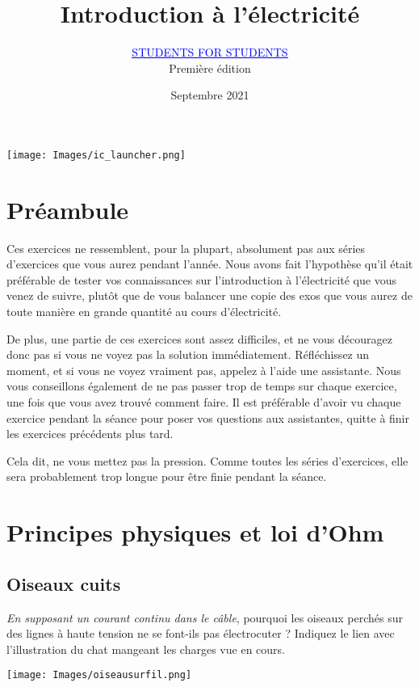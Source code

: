 \documentclass{article}
\title{Introduction à l'électricité}
\author{\href{https://s4s.fun}{\textcolor{blue}{\underline{STUDENTS FOR STUDENTS}}}\\Première édition}
\date{Septembre 2021}
\newcommand{\inc}{\fontfamily{cmr}\selectfont\textperiodcentered}
\begin{document}
\maketitle

\begin{center}
   \texttt{[image: Images/ic\_launcher.png]} 
\end{center}
\vfill
\tableofcontents
\vfill
\newpage

\setlength{\parskip}{1ex}

\section*{Préambule}

Ces exercices ne ressemblent, pour la plupart, absolument pas aux séries d'exercices que vous aurez pendant l'année. Nous avons fait l'hypothèse qu'il était préférable de tester vos connaissances sur l'introduction à l'électricité que vous venez de suivre, plutôt que de vous balancer une copie des exos que vous aurez de toute manière en grande quantité au cours d'électricité.

De plus, une partie de ces exercices sont assez difficiles, et ne vous découragez donc pas si vous ne voyez pas la solution immédiatement. Réfléchissez un moment, et si vous ne voyez vraiment pas, appelez à l'aide un\inc{}e assistant\inc{}e. Nous vous conseillons également de ne pas passer trop de temps sur chaque exercice, une fois que vous avez trouvé comment faire. Il est préférable d'avoir vu chaque exercice pendant la séance pour poser vos questions aux assistant\inc{}e\inc{}s, quitte à finir les exercices précédents plus tard.

Cela dit, ne vous mettez pas la pression. Comme toutes les séries d'exercices, elle sera probablement trop longue pour être finie pendant la séance. 

\section{Principes physiques et loi d'Ohm}

\subsection{Oiseaux cuits}
\textit{En supposant un courant continu dans le câble}, pourquoi les oiseaux perchés sur des lignes à haute tension ne se font-ils pas électrocuter ? Indiquez le lien avec l'illustration du chat mangeant les charges vue en cours.
\begin{center}
   \texttt{[image: Images/oiseausurfil.png]} 
\end{center}
\end{document}
